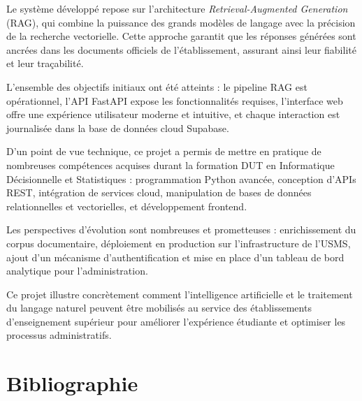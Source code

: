 \documentclass[12pt, a4paper, twoside]{report}
\newcommand{\term}[1]{\textit{\color{primary}#1}}
\begin{document}
Le système développé repose sur l'architecture \term{Retrieval-Augmented Generation} (RAG), qui combine la puissance des grands modèles de langage avec la précision de la recherche vectorielle. Cette approche garantit que les réponses générées sont ancrées dans les documents officiels de l'établissement, assurant ainsi leur fiabilité et leur traçabilité.

L'ensemble des objectifs initiaux ont été atteints : le pipeline RAG est opérationnel, l'API FastAPI expose les fonctionnalités requises, l'interface web offre une expérience utilisateur moderne et intuitive, et chaque interaction est journalisée dans la base de données cloud Supabase.

D'un point de vue technique, ce projet a permis de mettre en pratique de nombreuses compétences acquises durant la formation DUT en Informatique Décisionnelle et Statistiques : programmation Python avancée, conception d'APIs REST, intégration de services cloud, manipulation de bases de données relationnelles et vectorielles, et développement frontend.

Les perspectives d'évolution sont nombreuses et prometteuses : enrichissement du corpus documentaire, déploiement en production sur l'infrastructure de l'USMS, ajout d'un mécanisme d'authentification et mise en place d'un tableau de bord analytique pour l'administration.

Ce projet illustre concrètement comment l'intelligence artificielle et le traitement du langage naturel peuvent être mobilisés au service des établissements d'enseignement supérieur pour améliorer l'expérience étudiante et optimiser les processus administratifs.

\cleardoublepage

\chapter*{Bibliographie}
\end{document}
